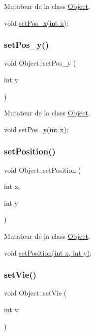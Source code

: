 Mutateur de la class \hyperlink{class_object}{Object}. 

void \hyperlink{class_object_a65c8e1794d02320269340d22084d0807}{set\+Pos\+\_\+x(int x)}; \mbox{\label{class_object_a35340b9a66cc2d561ad370783c41fcac}} 
\subsubsection{\texorpdfstring{set\+Pos\+\_\+y()}{setPos\_y()}}
{\footnotesize\ttfamily void Object\+::set\+Pos\+\_\+y (\begin{DoxyParamCaption}\item[{int}]{y }\end{DoxyParamCaption})}



Mutateur de la class \hyperlink{class_object}{Object}. 

void \hyperlink{class_object_a35340b9a66cc2d561ad370783c41fcac}{set\+Pos\+\_\+y(int x)}; \mbox{\label{class_object_a9e7f78b7cc24ebe4d11e8ce7b86c1d49}} 
\subsubsection{\texorpdfstring{set\+Position()}{setPosition()}}
{\footnotesize\ttfamily void Object\+::set\+Position (\begin{DoxyParamCaption}\item[{int}]{x,  }\item[{int}]{y }\end{DoxyParamCaption})}



Mutateur de la class \hyperlink{class_object}{Object}. 

void \hyperlink{class_object_a9e7f78b7cc24ebe4d11e8ce7b86c1d49}{set\+Position(int x, int y)}; \mbox{\label{class_object_ac0880db52bcbcd3022278d62956d666e}} 
\subsubsection{\texorpdfstring{set\+Vie()}{setVie()}}
{\footnotesize\ttfamily void Object\+::set\+Vie (\begin{DoxyParamCaption}\item[{int}]{v }\end{DoxyParamCaption})}



